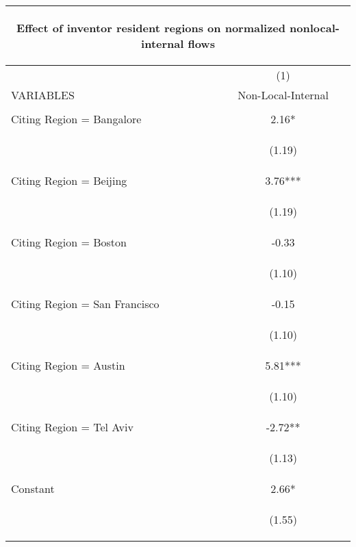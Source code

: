 \begin{center}
\begin{tabular}{lc}
\multicolumn{2}{c}{\begin{large}Effect of inventor resident regions on normalized nonlocal-internal flows \label{snonlocalinternal}\end{large}} \\ \hline
 & (1) \\
VARIABLES & Non-Local-Internal \\ \hline
\vspace{4pt} & \begin{footnotesize}\end{footnotesize} \\
Citing Region = Bangalore & 2.16* \\
\vspace{4pt} & \begin{footnotesize}(1.19)\end{footnotesize} \\
Citing Region = Beijing & 3.76*** \\
\vspace{4pt} & \begin{footnotesize}(1.19)\end{footnotesize} \\
Citing Region = Boston & -0.33 \\
\vspace{4pt} & \begin{footnotesize}(1.10)\end{footnotesize} \\
Citing Region = San Francisco & -0.15 \\
\vspace{4pt} & \begin{footnotesize}(1.10)\end{footnotesize} \\
Citing Region = Austin & 5.81*** \\
\vspace{4pt} & \begin{footnotesize}(1.10)\end{footnotesize} \\
Citing Region = Tel Aviv & -2.72** \\
\vspace{4pt} & \begin{footnotesize}(1.13)\end{footnotesize} \\
Constant & 2.66* \\
 & \begin{footnotesize}(1.55)\end{footnotesize} \\

\end{tabular}
\end{center}

